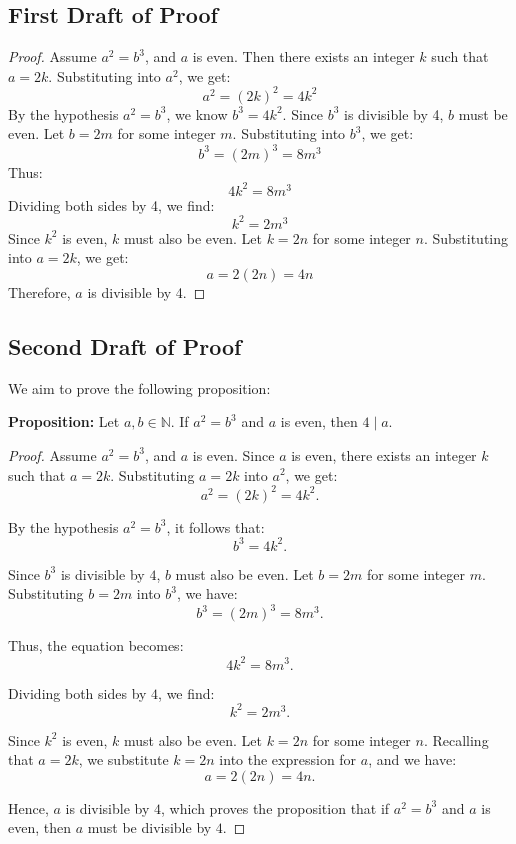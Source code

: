\newpage

\subsection{First Draft of Proof}

\begin{proof}
    Assume \( a^2 = b^3 \), and \( a \) is even. Then there exists an integer \( k \) such that \( a = 2k \). Substituting into \( a^2 \), we get:
    \[
    a^2 = (2k)^2 = 4k^2
    \]
    By the hypothesis \( a^2 = b^3 \), we know \( b^3 = 4k^2 \). Since \( b^3 \) is divisible by 4, \( b \) must be even. Let \( b = 2m \) for some integer \( m \). Substituting into \( b^3 \), we get:
    \[
    b^3 = (2m)^3 = 8m^3
    \]
    Thus:
    \[
    4k^2 = 8m^3
    \]
    Dividing both sides by 4, we find:
    \[
    k^2 = 2m^3
    \]
    Since \( k^2 \) is even, \( k \) must also be even. Let \( k = 2n \) for some integer \( n \). Substituting into \( a = 2k \), we get:
    \[
    a = 2(2n) = 4n
    \]
    Therefore, \( a \) is divisible by 4.
\end{proof}

\newpage

\subsection{Second Draft of Proof}

We aim to prove the following proposition:

\textbf{Proposition:} Let \( a, b \in \mathbb{N} \). If \( a^2 = b^3 \) and \( a \) is even, then \( 4 \mid a \).

\begin{proof}
    Assume \( a^2 = b^3 \), and \( a \) is even. Since \( a \) is even, there exists an integer \( k \) such that \( a = 2k \). Substituting \( a = 2k \) into \( a^2 \), we get:
    \[
    a^2 = (2k)^2 = 4k^2.
    \]

    By the hypothesis \( a^2 = b^3 \), it follows that:
    \[
    b^3 = 4k^2.
    \]

    Since \( b^3 \) is divisible by \( 4 \), \( b \) must also be even. Let \( b = 2m \) for some integer \( m \). Substituting \( b = 2m \) into \( b^3 \), we have:
    \[
    b^3 = (2m)^3 = 8m^3.
    \]

    Thus, the equation becomes:
    \[
    4k^2 = 8m^3.
    \]

    Dividing both sides by \( 4 \), we find:
    \[
    k^2 = 2m^3.
    \]

    Since \( k^2 \) is even, \( k \) must also be even. Let \( k = 2n \) for some integer \( n \). Recalling that \( a = 2k \), we substitute \( k = 2n \) into the expression for \( a \), and we have:  
    \[
    a = 2(2n) = 4n.
    \]

    Hence, \( a \) is divisible by \( 4 \), which proves the proposition that if \( a^2 = b^3 \) and \( a \) is even, then \( a \) must be divisible by \( 4 \).
\end{proof}

